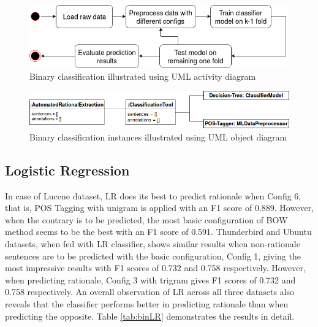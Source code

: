 \documentclass[a4paper,12pt,twoside]{report}
\begin{document}
\begin{figure}[h] %
    \centering
    \includegraphics[width=12cm]{binary-classification}
    \caption{Binary classification illustrated using UML activity diagram}
    \label{fig:binaryClass}
\end{figure}

\begin{figure}[h] %
    \centering
    \includegraphics[width=13cm]{binary-object-diagram}
    \caption{Binary classification instances illustrated using UML object diagram}
    \label{fig:instanceBinary}
\end{figure}

\subsection{Logistic Regression}
In case of Lucene dataset, \acs{LR} does its best to predict rationale when Config 6, that is, \acs{POS} Tagging with unigram is applied with an F1 score of 0.889. However, when the contrary is to be predicted, the most basic configuration of \acs{BOW} method seems to be the best with an F1 score of 0.591. Thunderbird and Ubuntu datasets, when fed with \acs{LR} classifier, shows similar results when non-rationale sentences are to be predicted with the basic configuration, Config 1, giving the most impressive results with F1 scores of 0.732 and 0.758 respectively. However, when predicting rationale, Config 3 with trigram gives F1 scores of 0.732 and 0.758 respectively. An overall observation of \acs{LR} across all three datasets also reveals that the classifier performs better in predicting rationale than when predicting the opposite. Table \ref{tab:binLR} demonstrates the results in detail. 
\end{document}
